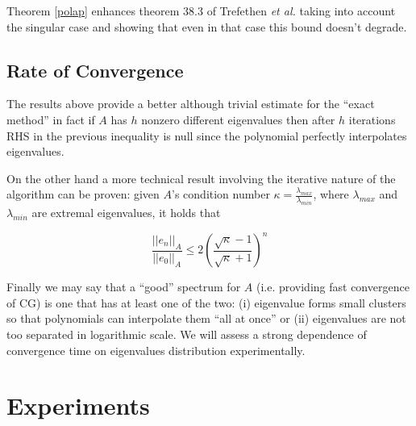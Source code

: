 \documentclass[12pt]{article}
\newcommand{\1}{\mathbbm{1}}
\begin{document}
 Theorem \ref{polap} enhances theorem 38.3 of Trefethen {\em et al.} \cite{trefethen97} taking into account the singular case and showing that even in that case this bound doesn't degrade.

\subsection{Rate of Convergence}
The results above provide a better although trivial estimate for the ``exact method'' in fact if $A$ has $h$ nonzero different eigenvalues then after $h$ iterations RHS in the previous inequality is null since the polynomial perfectly interpolates eigenvalues.

On the other hand a more technical result involving the iterative nature of the algorithm can be proven: given $A$'s condition number $\kappa = \frac{\lambda_{max}}{\lambda_{min}}$, where $\lambda_{max}$ and $\lambda_{min}$ are extremal eigenvalues, it holds that

$$ \frac{||e_n||_A}{||e_0||_A} \leq 2 \left(\frac{\sqrt{\kappa} - 1}{\sqrt{\kappa} + 1}\right)^n $$

Finally we may say that a ``good'' spectrum for $A$ (i.e. providing fast convergence of CG) is one that has at least one of the two: (i) eigenvalue forms small clusters so that polynomials can interpolate them ``all at once'' or (ii) eigenvalues are not too separated in logarithmic scale. We will assess a strong dependence of convergence time on eigenvalues distribution experimentally. 


\section{Experiments}
\end{document}
